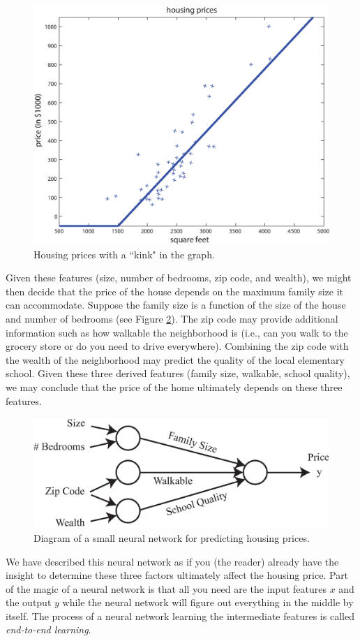 \documentclass{article}
\numberwithin{equation}{section}
\begin{document}
\begin{figure}[t]
	\centering
	\includegraphics[width=0.6\linewidth]{housingDataReLU.eps}
	\caption{Housing prices with a ``kink" in the graph.}\label{fig:housing}
\end{figure}

Given these features (size, number of bedrooms, zip code, and wealth), we might then decide that the price of the house depends on the maximum family size it can accommodate. Suppose the family size is a function of the size of the house and number of bedrooms (see Figure \ref{fig:mininet}). The zip code may provide additional information such as how walkable the neighborhood is (i.e., can you walk to the grocery store or do you need to drive everywhere). Combining the zip code with the wealth of the neighborhood may predict the quality of the local elementary school. Given these three derived features (family size, walkable, school quality), we may conclude that the price of the home ultimately depends on these three features.

\begin{figure}[h]
	\centering
	\includegraphics[width=0.6\linewidth]{mini_net.eps}
	\caption{Diagram of a small neural network for predicting housing prices.}\label{fig:mininet}
\end{figure}

We have described this neural network as if you (the reader) already have the insight to determine these three factors ultimately affect the housing price. Part of the magic of a neural network is that all you need are the input features $x$ and the output $y$ while the neural network will figure out everything in the middle by itself.
The process of a neural network learning the intermediate features is called \textit{end-to-end learning}.
\end{document}
